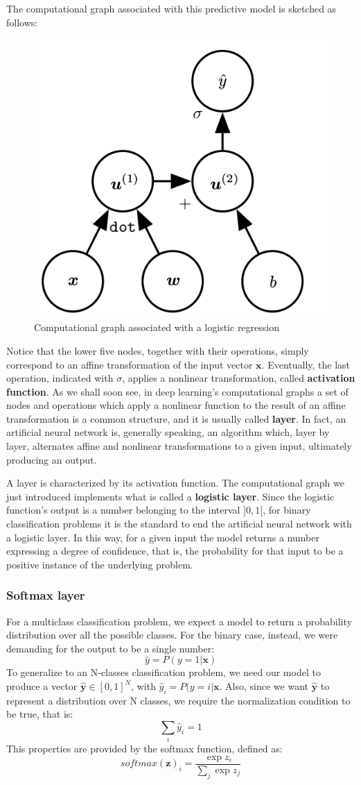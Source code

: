 \documentclass[a4paper, twoside]{article}
\begin{document}
        The computational graph associated with this predictive model is sketched as follows:

        \begin{figure}[H]
        \centering
        \includegraphics[width=0.4\linewidth]{compgraph.png}
        \caption{Computational graph associated with a logistic regression}
        \end{figure}

        Notice that the lower five nodes, together with their operations, simply correspond to an affine transformation of the input vector $\boldsymbol{x}$. Eventually, the last operation, indicated with $\sigma$, applies a nonlinear transformation, called \textbf{activation function}. As we shall soon see, in deep learning's computational graphs a set of nodes and operations which apply a nonlinear function to the result of an affine transformation is a common structure, and it is usually called \textbf{layer}. In fact, an artificial neural network is, generally speaking, an algorithm which, layer by layer, alternates affine and nonlinear transformations to a given input, ultimately producing an output.

        A layer is characterized by its activation function. The computational graph we just introduced implements what is called a \textbf{logistic layer}. Since the logistic function's output is a number belonging to the interval $]0, 1[$, for binary classification problems it is the standard to end the artificial neural network with a logistic layer. In this way, for a given input the model returns a number expressing a degree of confidence, that is, the probability for that input to be a positive instance of the underlying problem.

        \subsubsection{Softmax layer}

        For a multiclass classification problem, we expect a model to return a probability distribution over all the possible classes. For the binary case, instead, we were demanding for the output to be a single number:
        $$ \hat{y} = P(y = 1 | \boldsymbol{x}) $$
        To generalize to an N-classes classification problem, we need our model to produce a vector $\boldsymbol{\hat{y}} \in [0,1]^N $, with $\hat{y}_i = P(y = i | \boldsymbol{x}$. Also, since we want $\boldsymbol{\hat{y}}$ to represent a distribution over N classes, we require the normalization condition to be true, that is:
        $$ \sum\limits_{i} \hat{y}_i = 1 $$
        This properties are provided by the softmax function, defined as:
        $$softmax(\boldsymbol{z})_i = \frac{\exp{z_i}}{\sum\limits_{j} \exp{z_j}} $$
\end{document}
